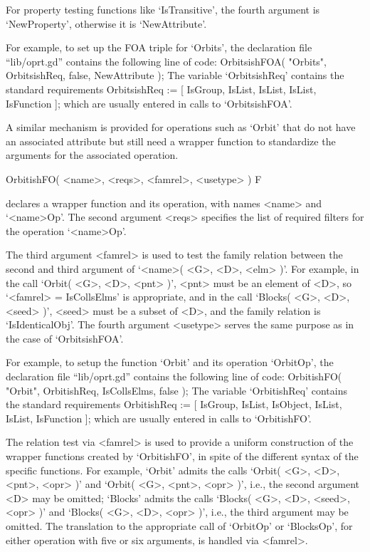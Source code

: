 For  property testing functions  like `IsTransitive',
the fourth argument is `NewProperty', otherwise it is `NewAttribute'.

For example, to set up the FOA triple for `Orbits',
the declaration file ``lib/oprt.gd'' contains the following line of code:
\begintt
OrbitsishFOA( "Orbits", OrbitsishReq, false, NewAttribute );
\endtt
The variable `OrbitsishReq' contains the standard requirements
\begintt
OrbitsishReq := [ IsGroup, IsList,
		  IsList,
		  IsList,
		  IsFunction ];
\endtt
which are usually entered in calls to `OrbitsishFOA'.

A similar mechanism is provided for operations such as `Orbit' that do
not have an associated attribute but still need a wrapper function to
standardize the arguments for the associated operation.

\>OrbitishFO( <name>, <reqs>, <famrel>, <usetype> ) F

declares a wrapper function and its operation,
with names <name> and `<name>Op'.
The second argument <reqs> specifies the list of required filters for the
operation `<name>Op'.

The third argument <famrel>  is used to  test the family relation between
the  second  and third  argument of `<name>( <G>, <D>, <elm> )'.
For example, in the call `Orbit( <G>, <D>, <pnt> )',
<pnt> must be an element of <D>, so `<famrel> = IsCollsElms' is
appropriate, and in the call `Blocks( <G>, <D>, <seed> )',
<seed> must be a subset of <D>,
and the family relation is `IsIdenticalObj'.
The fourth argument <usetype> serves the  same purpose as  in the case of
`OrbitsishFOA'.

For example, to setup the function `Orbit' and its operation `OrbitOp',
the declaration file ``lib/oprt.gd'' contains the following line of code:
\begintt
OrbitishFO( "Orbit", OrbitishReq, IsCollsElms, false );
\endtt
The variable `OrbitishReq' contains the standard requirements
\begintt
OrbitishReq  := [ IsGroup, IsList, IsObject,
		  IsList,
		  IsList,
		  IsFunction ];
\endtt
which are usually entered in calls to `OrbitishFO'.

The relation test via <famrel> is used to provide a uniform construction
of the wrapper functions created by `OrbitishFO',
in spite of the different syntax of the specific functions.
For example, `Orbit' admits the calls `Orbit( <G>, <D>, <pnt>, <opr> )'
and `Orbit( <G>, <pnt>, <opr> )', i.e., the second argument <D> may be
omitted;
`Blocks' admits the calls `Blocks( <G>, <D>, <seed>, <opr> )' and
`Blocks( <G>, <D>, <opr> )', i.e., the third argument may be omitted.
The translation to the appropriate call of `OrbitOp' or `BlocksOp',
for either operation with five or six arguments, 
is handled via <famrel>.

